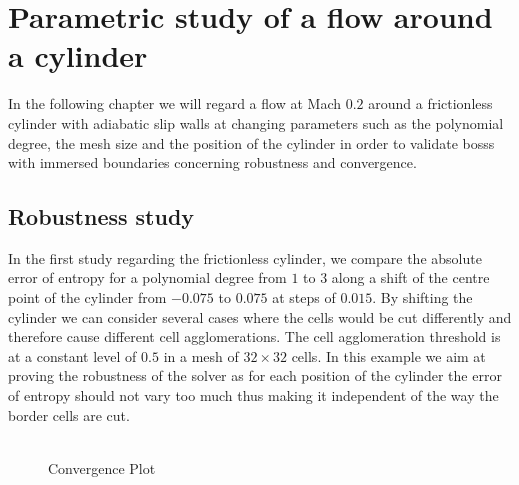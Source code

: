 \chapter{Parametric study of a flow around a cylinder}
	\label{eulerVerification}
	In the following chapter we will regard a flow at Mach $0.2$ around a frictionless cylinder with adiabatic slip walls at changing parameters such as the polynomial degree, the mesh size and the position of the cylinder in order to validate \gls{bosss} with immersed boundaries concerning robustness and convergence.

	\section{Robustness study}
	In the first study regarding the frictionless cylinder, we compare the absolute error of entropy for a polynomial degree from $1$ to $3$ along a shift of the centre point of the cylinder from $-0.075$ to $0.075$ at steps of $0.015$. By shifting the cylinder we can consider several cases where the cells would be cut differently and therefore cause different cell agglomerations. The cell agglomeration threshold is at a constant level of $0.5$ in a mesh of $32 \times 32$ cells. In this example we aim at proving the robustness of the solver as for each position of the cylinder the error of entropy should not vary too much thus making it independent of the way the border cells are cut. \\ \\

	\begin{figure}[htp]	
		\centering
		\caption{Convergence Plot}
		\label{shifterror}
	\end{figure}
	

